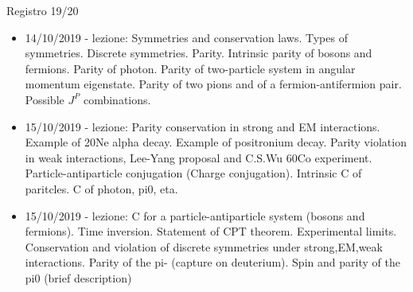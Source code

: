 \begin{frame}[allowframebreaks]{Registro 19/20}
\begin{itemize}
\item 14/10/2019 - lezione: Symmetries and conservation laws. Types of symmetries. Discrete symmetries. Parity. Intrinsic parity of bosons and fermions. Parity of photon. Parity of two-particle system in angular momentum eigenstate. Parity of two pions and of a fermion-antifermion pair. Possible $J^P$ combinations.
\item 15/10/2019 - lezione: Parity conservation in strong and EM interactions. Example of 20Ne alpha decay. Example of positronium decay. Parity violation in weak interactions, Lee-Yang proposal and C.S.Wu 60Co experiment. Particle-antiparticle conjugation (Charge conjugation). Intrinsic C of paritcles. C of photon, pi0, eta. 
\item 15/10/2019 - lezione: C for a particle-antiparticle system (bosons and fermions). Time inversion. Statement of CPT theorem. Experimental limits. Conservation and violation of discrete symmetries under strong,EM,weak interactions. Parity of the pi- (capture on deuterium). Spin and parity of the pi0 (brief description)
\end{itemize}
\end{frame}

